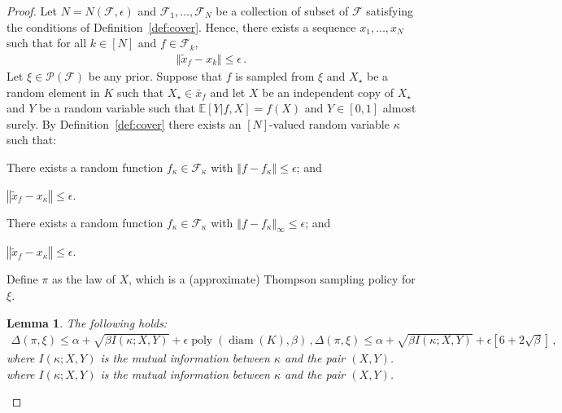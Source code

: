 \documentclass[letter, 12pt]{report}
\newcommand{\norm}[1]{\left \Vert  #1 \right \Vert}
\newcommand{\snorm}[1]{ \Vert  #1 \Vert}
\newcommand{\E}{\mathbb E}
\newcommand{\sF}{\mathscr F}
\newcommand{\sP}{\mathscr P}
\newcommand{\diam}{\operatorname{diam}}
\newcommand{\poly}{\operatorname{poly}}
\newcommand{\1}{\mathbf{1}}
\theoremstyle{plain}
\newtheorem{lemma}[theorem]{Lemma}
\theoremstyle{definition}
\theoremstyle{remark}
\begin{document}
\begin{proof}
    Let $N = N(\sF, \epsilon)$
    and $\sF_1,\ldots,\sF_N$ be a collection of subset of $\sF$ satisfying the conditions of Definition~\ref{def:cover}.
    Hence, there exists a sequence $x_1,\ldots,x_N$ such that for all $k \in [N]$ and $f \in \sF_k$,
    \begin{align*}
        \snorm{\tilde x_f - x_k} \leq \epsilon \,.
    \end{align*}
    Let $\xi \in \sP(\sF)$ be any prior.
    Suppose that $f$ is sampled from $\xi$ and $X_\star$ be a random element in $K$ such that $X_\star \in \bar x_f$ and let $X$ be an independent copy of $X_\star$
    and $Y$ be a random variable such that $\E[Y|f, X] = f(X)$ and $Y \in [0,1]$ almost surely.
    By Definition~\ref{def:cover} there exists an $[N]$-valued random variable $\kappa$ such that:
    \begin{enumroman}
        \item There exists a random function $f_\kappa \in \sF_\kappa$ with $\norm{f - f_\kappa} \leq \epsilon$; and
        \item $\norm{\tilde x_f - x_\kappa} \leq \epsilon$.
        \item There exists a random function $f_\kappa \in \sF_\kappa$ with $\norm{f - f_\kappa}_\infty \leq \epsilon$; and \label{proof:ir:i}
        \item $\norm{\tilde x_f - x_\kappa} \leq \epsilon$. \label{proof:ir:ii}
    \end{enumroman}
    Define $\pi$ as the law of $X$, which is a (approximate) Thompson sampling policy for $\xi$.

    \begin{lemma}\label{lem:ir}
        The following holds:
        \begin{align*}
            \Delta(\pi, \xi) \leq \alpha + \sqrt{\beta I(\kappa ; X, Y)} + \epsilon \poly(\diam(K), \beta) \,,
            \Delta(\pi, \xi) \leq \alpha + \sqrt{\beta I(\kappa ; X, Y)} + \epsilon [6 + 2 \sqrt{\beta}] \,,
        \end{align*}
        where $I(\kappa ; X, Y)$ is the mutual information
        between $\kappa$ and the pair $(X, Y)$.
        where $I(\kappa ; X, Y)$ is the mutual information between $\kappa$ and the pair $(X, Y)$.
    \end{lemma}


\end{proof}
\end{document}
